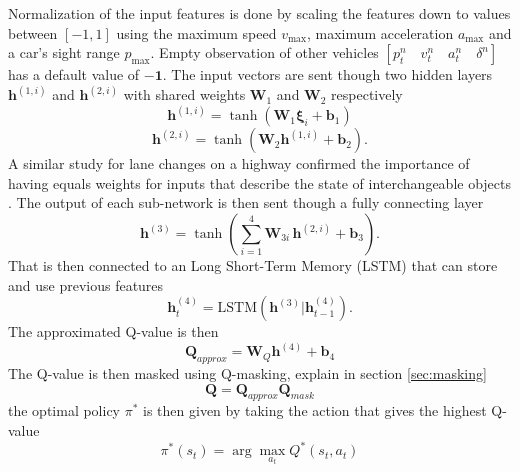Normalization of the input features is done by scaling the features down to values between $[-1,1]$ using the maximum speed $v_{\max}$, maximum acceleration $a_{\max}$ and a car's sight range $p_{\max}$. Empty observation of other vehicles $[p^n_t \quad v^n_t \quad a^n_t \quad \delta^n ]$ has a default value of $-\mathbf{1}$. The input vectors are sent though two hidden layers $\bm{h}^{(1, i)}$ and $\bm{h}^{(2, i)}$ with shared weights $\bm{W}_1$ and $\bm{W}_2$ respectively
\begin{equation}
\bm{h}^{(1, i)} = \tanh\left(\bm{W}_1 \bm\xi_i + \bm{b}_1\right)
\end{equation}
\begin{equation}
\bm{h}^{(2, i)} = \tanh\left(\bm{W}_2 \bm{h}^{(1, i)} + \bm{b}_2\right).
\end{equation}
A similar study for lane changes on a highway confirmed the importance of having equals weights for inputs that describe the state of interchangeable objects \cite{Hoel}. The output of each sub-network is then sent though a fully connecting layer 
\begin{equation}
\label{eq:shared_weights}
\bm{h}^{(3)} = \tanh\left(\sum_{i=1}^4 \bm{W}_{3i} \, \bm{h}^{(2, i)} + \bm{b}_3\right).
\end{equation}
That is then connected to an Long Short-Term Memory (LSTM) \cite{Hochreiter1997LONGMEMORY} that can store and use previous features
\begin{equation}
\bm{h}^{(4)}_t = \text{LSTM}\left( \bm{h}^{(3)} | \bm{h}^{(4)}_{t-1} \right).
\end{equation}
The approximated Q-value is then
\begin{equation}
\bm{Q}_{approx} = \bm{W}_Q \bm{h}^{(4)}+ \bm{b}_4
\end{equation}
The Q-value is then masked using Q-masking, explain in section \ref{sec:masking}
\begin{equation}
\bm{Q} = \bm{Q}_{approx}  \bm{Q}_{mask}
\end{equation}
the optimal policy $\pi^*$ is then given by taking the action that gives the highest Q-value
\begin{equation}
\pi^*(s_t) = \arg\max_{a_t} Q^*(s_t,a_t)
\end{equation}

